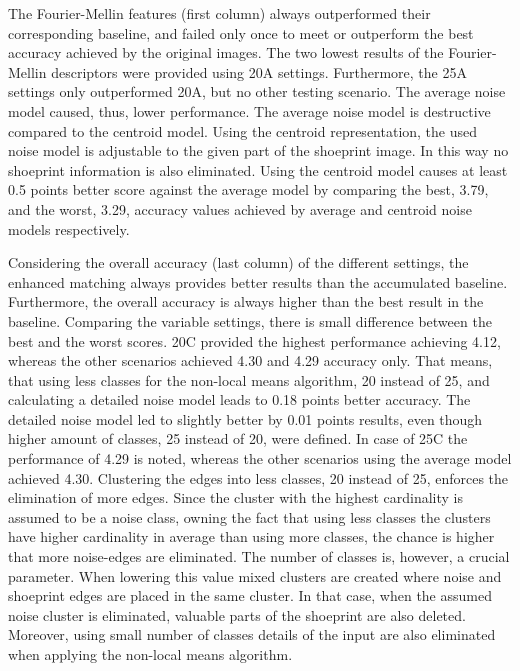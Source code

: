 \documentclass[draft,final]{vutinfth} %
\begin{document}
\par
The Fourier-Mellin features (first column) always outperformed their corresponding baseline, and failed only once to meet or outperform the best accuracy achieved by the original images.
The two lowest results of the Fourier-Mellin descriptors were provided using 20A settings.
Furthermore, the 25A settings only outperformed 20A, but no other testing scenario.
The average noise model caused, thus, lower performance.
The average noise model is destructive compared to the centroid model.
Using the centroid representation, the used noise model is adjustable to the given part of the shoeprint image.
In this way no shoeprint information is also eliminated. 
Using the centroid model causes at least 0.5 points better score against the average model by comparing the best, 3.79, and the worst, 3.29, accuracy values achieved by average and centroid noise models respectively.
\par
Considering the overall accuracy (last column) of the different settings, the enhanced matching always provides better results than the accumulated baseline.
Furthermore, the overall accuracy is always higher than the best result in the baseline.
Comparing the variable settings, there is small difference between the best and the worst scores.
20C provided the highest performance achieving 4.12, whereas the other scenarios achieved 4.30 and 4.29 accuracy only.
That means, that using less classes for the non-local means algorithm, 20 instead of 25, and calculating a detailed noise model leads to 0.18 points better accuracy.
The detailed noise model led to slightly better by 0.01 points results, even though higher amount of classes, 25 instead of 20, were defined.
In case of 25C the performance of 4.29 is noted, whereas the other scenarios using the average model achieved 4.30.
Clustering the edges into less classes, 20 instead of 25, enforces the elimination of more edges.
Since the cluster with the highest cardinality is assumed to be a noise class,  owning the fact that using less classes the clusters have higher cardinality  in average than using more classes, the chance is higher that more noise-edges are eliminated.
The number of classes is, however, a crucial parameter.
When lowering this value mixed clusters are created where noise and shoeprint edges are placed in the same cluster.
In that case, when the assumed noise cluster is eliminated, valuable parts of the shoeprint are also deleted.
Moreover, using small number of classes details of the input are also eliminated when applying the non-local means algorithm.
\end{document}

